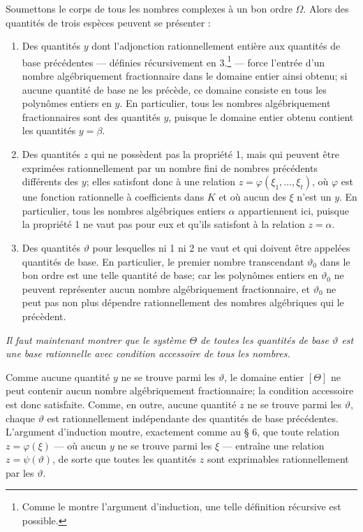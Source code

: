 Soumettons le corps de tous les nombres complexes à un bon ordre $\Omega$. Alors des quantités de trois espèces peuvent se présenter :
\begin{enumerate}
\item[1.] Des quantités $y$ dont l'adjonction rationnellement entière aux quantités de base précédentes --- définies récursivement en 3.\footnote{Comme le montre l'argument d'induction, une telle définition récursive est possible.} --- force l'entrée d'un nombre algébriquement fractionnaire dans le domaine entier ainsi obtenu; si aucune quantité de base ne les précède, ce domaine consiste en tous les polynômes entiers en $y$. En particulier, tous les nombres algébriquement fractionnaires sont des quantités $y$, puisque le domaine entier obtenu contient les quantités $y=\beta$.
\item[2.] Des quantités $z$ qui ne possèdent pas la propriété 1, mais qui peuvent être exprimées rationnellement par un nombre fini de nombres précédents différents des $y$; elles satisfont donc à une relation $z=\varphi(\xi_1,\ldots,\xi_t)$, où $\varphi$ est une fonction rationnelle à coefficients dans $K$ et où aucun des $\xi$ n'est un $y$. En particulier, tous les nombres algébriques entiers $\alpha$ appartiennent ici, puisque la propriété 1 ne vaut pas pour eux et qu'ils satisfont à la relation $z=\alpha$.
\item[3.] Des quantités $\vartheta$ pour lesquelles ni 1 ni 2 ne vaut et qui doivent être appelées quantités de base. En particulier, le premier nombre transcendant $\vartheta_0$ dans le bon ordre est une telle quantité de base; car les polynômes entiers en $\vartheta_0$ ne peuvent représenter aucun nombre algébriquement fractionnaire, et $\vartheta_0$ ne peut pas non plus dépendre rationnellement des nombres algébriques qui le précèdent.
\end{enumerate}

\emph{Il faut maintenant montrer que le système $\Theta$ de toutes les quantités de base $\vartheta$ est une base rationnelle avec condition accessoire de tous les nombres.}

Comme aucune quantité $y$ ne se trouve parmi les $\vartheta$, le domaine entier $[\Theta]$ ne peut contenir aucun nombre algébriquement fractionnaire; la condition accessoire est donc satisfaite. Comme, en outre, aucune quantité $z$ ne se trouve parmi les $\vartheta$, chaque $\vartheta$ est rationnellement indépendante des quantités de base précédentes. L'argument d'induction montre, exactement comme au \S{} 6, que toute relation $z=\varphi(\xi)$ --- où aucun $y$ ne se trouve parmi les $\xi$ --- entraîne une relation $z=\psi(\vartheta)$, de sorte que toutes les quantités $z$ sont exprimables rationnellement par les $\vartheta$.

